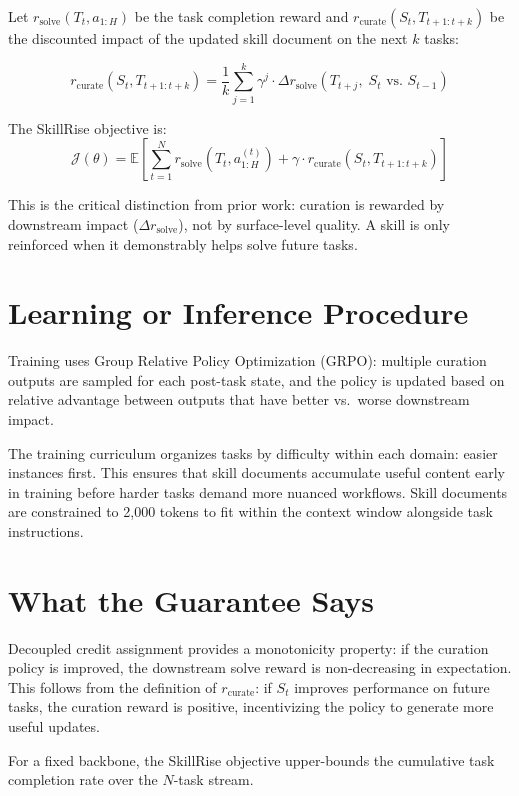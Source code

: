 \documentclass[10pt,twocolumn]{article}
\begin{document}
Let $r_{\mathrm{solve}}(T_t, a_{1:H})$ be the task completion reward and
$r_{\mathrm{curate}}(S_t, T_{t+1:t+k})$ be the discounted impact of the
updated skill document on the next $k$ tasks:

\[
  r_{\mathrm{curate}}(S_t, T_{t+1:t+k}) =
    \frac{1}{k}\sum_{j=1}^{k} \gamma^j \cdot
    \Delta r_{\mathrm{solve}}(T_{t+j},\; S_t \text{ vs.\ } S_{t-1})
\]

The SkillRise objective is:
\[
  \mathcal{J}(\theta) = \mathbb{E}\!\left[
    \sum_{t=1}^{N} r_{\mathrm{solve}}(T_t, a_{1:H}^{(t)})
    + \gamma \cdot r_{\mathrm{curate}}(S_t, T_{t+1:t+k})
  \right]
\]

This is the critical distinction from prior work: curation is rewarded by
downstream impact ($\Delta r_{\mathrm{solve}}$), not by surface-level quality.
A skill is only reinforced when it demonstrably helps solve future tasks.

\section{Learning or Inference Procedure}

Training uses Group Relative Policy Optimization (GRPO): multiple curation
outputs are sampled for each post-task state, and the policy is updated
based on relative advantage between outputs that have better vs.\ worse
downstream impact.

The training curriculum organizes tasks by difficulty within each domain:
easier instances first. This ensures that skill documents accumulate useful
content early in training before harder tasks demand more nuanced workflows.
Skill documents are constrained to 2,000 tokens to fit within the context
window alongside task instructions.

\section{What the Guarantee Says}

Decoupled credit assignment provides a monotonicity property: if the
curation policy is improved, the downstream solve reward is non-decreasing
in expectation. This follows from the definition of $r_{\mathrm{curate}}$:
if $S_t$ improves performance on future tasks, the curation reward is
positive, incentivizing the policy to generate more useful updates.

For a fixed backbone, the SkillRise objective upper-bounds the cumulative
task completion rate over the $N$-task stream.
\end{document}
